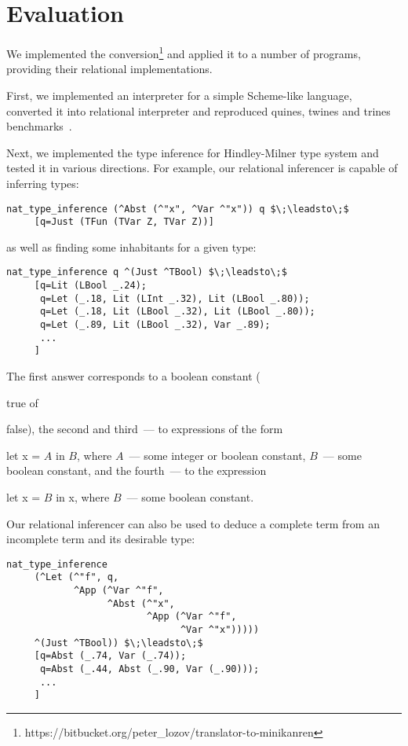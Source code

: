 \documentclass[10pt, oneside, nocopyrightspace]{sigplanconf}
\newcommand*{\SavedLstInline}{}
\DeclareRobustCommand*{\lstinline}{%
  \ifmmode
    \let\SavedBGroup\bgroup
    \def\bgroup{%
      \let\bgroup\SavedBGroup
      \hbox\bgroup
    }%
  \fi
  \SavedLstInline
}
\begin{document}
\section{Evaluation}

We implemented the conversion\footnote{https://bitbucket.org/peter\_lozov/translator-to-minikanren} and applied it to a number of programs, 
providing their relational implementations. 

First, we implemented an interpreter for a simple Scheme-like language, converted it into relational interpreter and reproduced quines, twines 
and trines benchmarks~\cite{Untagged}. 

Next, we implemented the type inference for Hindley-Milner type system and tested it in various directions. For example, our relational
inferencer is capable of inferring types:

\begin{lstlisting}[basicstyle=\small]
   nat_type_inference (^Abst (^"x", ^Var ^"x")) q $\;\leadsto\;$ 
     [q=Just (TFun (TVar Z, TVar Z))]
\end{lstlisting}

\noindent as well as finding some inhabitants for a given type:

\begin{lstlisting}[basicstyle=\small]
   nat_type_inference q ^(Just ^TBool) $\;\leadsto\;$
     [q=Lit (LBool _.24); 
      q=Let (_.18, Lit (LInt _.32), Lit (LBool _.80)); 
      q=Let (_.18, Lit (LBool _.32), Lit (LBool _.80)); 
      q=Let (_.89, Lit (LBool _.32), Var _.89); 
      ...
     ]
\end{lstlisting}

The first answer corresponds to a boolean constant (\lstinline{true} of \lstinline{false}), the second and third~---
to expressions of the form \lstinline{let x = $A$ in $B$}, where $A$~--- some integer or boolean
constant, $B$~--- some boolean constant, and the fourth~--- to the expression \lstinline{let x = $B$ in x}, where
$B$~--- some boolean constant.

Our relational inferencer can also be used to deduce a complete term from an incomplete term and its desirable type:

\begin{lstlisting}[basicstyle=\small]
   nat_type_inference 
     (^Let (^"f", q, 
            ^App (^Var ^"f", 
                  ^Abst (^"x", 
                         ^App (^Var ^"f", 
                               ^Var ^"x"))))) 
     ^(Just ^TBool)) $\;\leadsto\;$
     [q=Abst (_.74, Var (_.74)); 
      q=Abst (_.44, Abst (_.90, Var (_.90))); 
      ...
     ]
\end{lstlisting}
\end{document}

